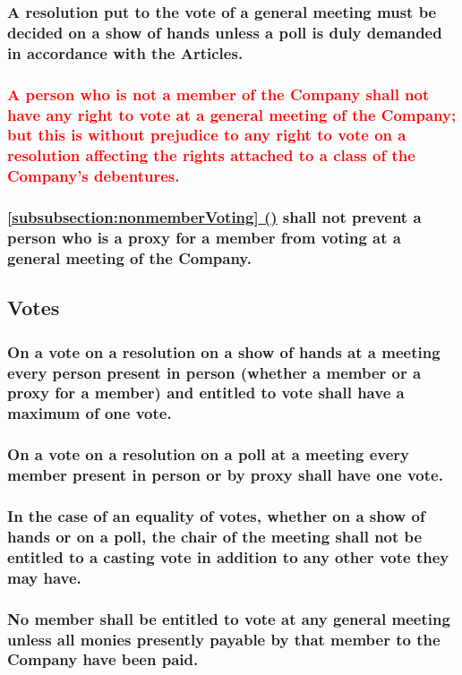 \documentclass[12pt]{article}
\newcommand*{\fancyref}[1]{\hyperref[{#1}]{\autoref*{#1} (\nameref*{#1})}}
\begin{document}
\subsubsection{A resolution put to the vote of a general meeting must be decided on a show of hands unless a poll is duly demanded in accordance with the Articles.}
\subsubsection[Only Members may vote at general meetings]{\textcolor{red}{A person who is not a member of the Company shall not have any right to vote at a general meeting of the Company; but this is without prejudice to any right to vote on a resolution affecting the rights attached to a class of the Company's debentures.}} \label{subsubsection:nonmemberVoting}
\subsubsection[Proxies may vote on Members' behalf]{\fancyref{subsubsection:nonmemberVoting} shall not prevent a person who is a proxy for a member from voting at a general meeting of the Company.}

\subsection{Votes}
\subsubsection[Maximum one vote in show of hands]{On a vote on a resolution on a show of hands at a meeting every person present in person (whether a member or a proxy for a member) and entitled to vote shall have a maximum of one vote.}
\subsubsection[Maximum one vote on resolution on poll]{On a vote on a resolution on a poll at a meeting every member present in person or by proxy shall have one vote.}
\subsubsection[No casting vote for meeting chair]{In the case of an equality of votes, whether on a show of hands or on a poll, the chair of the meeting shall not be entitled to a casting vote in addition to any other vote they may have.}
\subsubsection[Member may not vote unless all monies payable paid]{No member shall be entitled to vote at any general meeting unless all monies presently payable by that member to the Company have been paid.}
\end{document}
